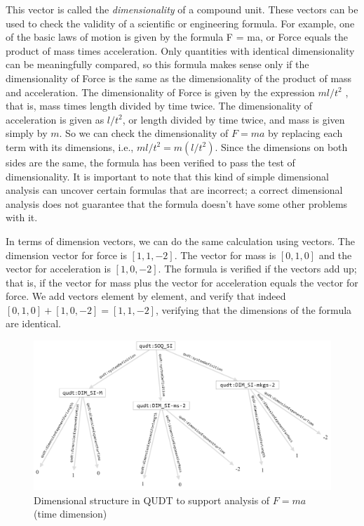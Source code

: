 This vector is called the \emph{dimensionality} of a compound unit. These
vectors can be used to check the validity of a scientific or engineering
formula. For example, one of the basic laws of motion is given by the
formula F = ma, or Force equals the product of mass times acceleration.
Only quantities with identical dimensionality can be meaningfully
compared, so this formula makes sense only if the dimensionality of
Force is the same as the dimensionality of the product of mass and
acceleration. The dimensionality of Force is given by the expression
$ml/{t^2}$ , that is, mass times length divided by time twice. The
dimensionality of acceleration is given as $l/{t^2}$, or length divided by
time twice, and mass is given simply by $m$. So we can check the
dimensionality of $F = ma$ by replacing each term with its dimensions,
i.e., ${ml}/{t^2} = m(l/{t^2})$. Since the dimensions on both sides are the
same, the formula has been verified to pass the test of dimensionality.
It is important to note that this kind of simple dimensional analysis
can uncover certain formulas that are incorrect; a correct dimensional
analysis does not guarantee that the formula doesn't have some other
problems with it.

In terms of dimension vectors, we can do the same calculation using
vectors. The dimension vector for force is $[1, 1, -2]$. The vector
for mass is $[0, 1, 0]$ and the vector for acceleration is $[1, 0,
-2]$. The formula is verified if the vectors add up; that is, if the
vector for mass plus the vector for acceleration
equals the vector for force. We add vectors element by element, and
verify that indeed $[0, 1, 0] + [1, 0, -2] = [1, 1, -2]$, verifying that the dimensions of the
formula are identical.


\begin{figure}
\centering
\includegraphics[width=5in]{SWWOv3/media/ch14/Figurech14.1.png}
\caption{Dimensional structure in QUDT to support analysis of $F=ma$ (time
dimension)}
\label{fig:ch14.04}
\end{figure}






